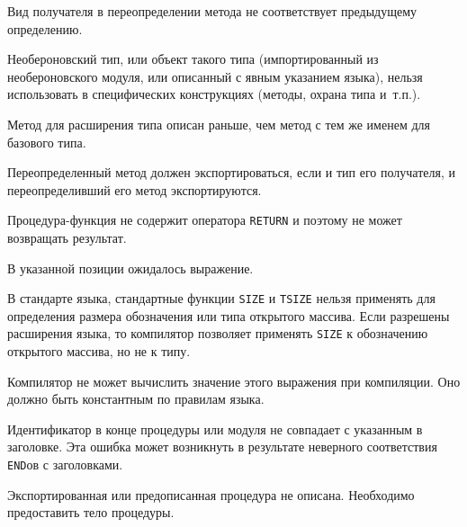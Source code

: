 
Вид получателя в переопределении метода не соответствует предыдущему
определению.


Необероновский тип, или объект такого типа (импортированный из
необероновского модуля, или описанный с явным указанием языка),
нельзя использовать в специфических 
\ot{} конструкциях (методы, охрана типа и~т.п.).


Метод для расширения типа описан раньше, чем метод с тем же именем
для базового типа.


Переопределенный метод должен экспортироваться, если и тип его 
получателя, и переопределивший его метод экспортируются.


Процедура-функция не содержит оператора \verb'RETURN' и поэтому не может 
возвращать результат.


В указанной позиции ожидалось выражение.


В стандарте языка, стандартные функции \verb'SIZE' и \verb'TSIZE' 
нельзя применять для определения размера обозначения или типа открытого
массива. Если разрешены расширения языка, то компилятор позволяет
применять \verb'SIZE' к обозначению открытого массива, но не к типу.


Компилятор не может вычислить значение этого выражения при компиляции.
Оно должно быть константным по правилам языка.


Идентификатор в конце процедуры или модуля не совпадает
с указанным в заголовке. Эта ошибка может возникнуть
в результате неверного соответствия \verb'END'ов с
заголовками.


Экспортированная или предописанная процедура не описана.
Необходимо предоставить тело процедуры.

